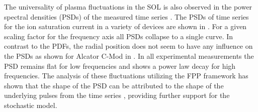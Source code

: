 The universality of plasma fluctuations in the SOL is also observed in the power spectral densities (PSDs) of the measured time series \cite{pedrosa1999empirical,carreras1999characterization,theodorsen2017relationship,theodorsen2018universality,kube2018intermittent,garcia2018intermittent}. The PSDs of time series for the ion saturation current in a variety of devices are shown in . For a given scaling factor for the frequency axis all PSDs collapse to a single curve. In contrast to the PDFs, the radial position does not seem to have any influence on the PSDs as shown for Alcator C-Mod in . In all experimental measurements the PSD remains flat for low frequencies and shows a power law decay for high frequencies. The analysis of these fluctuations utilizing the FPP framework has shown that the shape of the PSD can be attributed to the shape of the underlying pulses from the time series \cite{garcia2017auto}, providing further support for the stochastic model.
